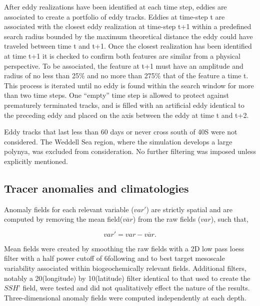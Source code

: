 \documentclass{article}
\begin{document}
After eddy realizations have been identified at each time step, eddies are associated to create a portfolio of eddy tracks. Eddies at time-step t are associated with the closest eddy realization at time-step t+1 within a predefined search radius bounded by the maximum theoretical distance the eddy could have traveled between time t and t+1. Once the closest realization has been identified at time t+1 it is checked to confirm both features are similar from a physical perspective. To be associated, the feature at t+1 must have an amplitude and radius of no less than 25\% and no more than 275\% that of the feature a time t. This process is iterated until no eddy is found within the search window for more than two time steps. One “empty” time step is allowed to protect against prematurely terminated tracks, and is filled with an artificial eddy identical to the preceding eddy and placed on the axis between the eddy at time t and t+2. 

Eddy tracks that last less than 60 days or never cross south of 40\degree S were not considered. The Weddell Sea region, where the simulation develops a large polynya, was excluded from consideration. No further filtering was imposed unless explicitly mentioned.

\subsection{Tracer anomalies and climatologies}

Anomaly fields for each relevant variable ($var'$) are strictly spatial and are computed by removing the mean field($\overline{var}$) from the raw fields ($var$), such that, 

\begin{equation}
    var' = var - \overline{var}. 
\end{equation}

Mean fields were created by smoothing the raw fields with a 2D low pass loess filter with a half power cutoff of 6\degree following \textcite{GaubeRegionalvariationsinfluence2014} and \textcite{Longrolemesoscaleeddies2018} to best target mesoscale variability associated within biogeochemically relevant fields. Additional filters, notably a 20\degree (longitude) by 10\degree (latitude) filter identical to that used to create the $SSH’$ field, were tested and did not qualitatively effect the nature of the results. Three-dimensional anomaly fields were computed independently at each depth. 
\end{document}
